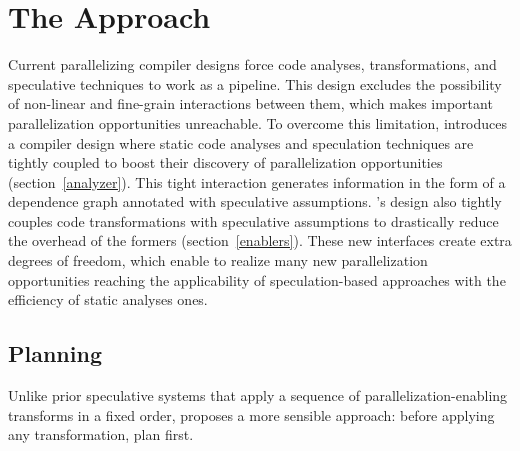 \section{The \name Approach}
\label{sec:approach}

Current parallelizing compiler designs force code analyses, transformations, and speculative techniques to work as a pipeline.
This design excludes the possibility of non-linear and fine-grain interactions between them, which makes important parallelization opportunities unreachable.
To overcome this limitation, \name introduces a compiler design where static code analyses and speculation techniques are tightly coupled to boost their discovery of parallelization opportunities (section~\ref{analyzer}).
This tight interaction generates information in the form of a dependence graph annotated with speculative assumptions.
\namensp's design also tightly couples code transformations with speculative assumptions to drastically reduce the overhead of the formers (section~\ref{enablers}).
These new interfaces create extra degrees of freedom, which enable \name to realize many new parallelization opportunities reaching the applicability of speculation-based approaches with the efficiency of static analyses ones.


\subsection{Planning}
\label{planning}
%
Unlike prior speculative systems that apply a sequence of
parallelization-enabling transforms in a fixed order, \name proposes a
more sensible approach: before applying any transformation, plan
first.

